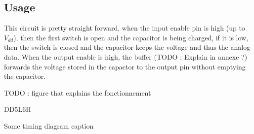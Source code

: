 \subsection{Usage}

This circuit is pretty straight forward, when the input enable pin is high (up to $V_{dd}$), then the first switch is open and the capacitor is being charged, if it is low, then the switch is closed and the capacitor keeps the voltage and thus the analog data. When the output enable is high, the buffer (TODO : Explain in annexe ?) forwards the voltage stored in the capactor to the output pin without emptying the capacitor.

TODO : figure that explains the fonctionnement

\begin{timingdiag}[!ht]
  \centering
  DD5L6H
  \caption{Some timing diagram caption}
  \label{tim:foobar }
\end{timingdiag}
